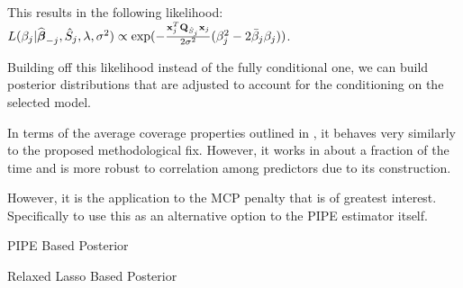 
This results in the following likelihood: $L(\beta_j|\widehat{\boldsymbol{\beta}}_{-j}, \hat{S}_j, \lambda, \sigma^2) \propto \exp(-\frac{\mathbf{x}_j^T \mathbf{Q}_{\hat{S}_j} \mathbf{x}_j}{2\sigma^2}(\beta_{j}^2 - 2 \bar{\beta}_{j} \beta_{j}))$. 

Building off this likelihood instead of the fully conditional one, we can build posterior distributions that are adjusted to account for the conditioning on the selected model.

In terms of the average coverage properties outlined in , it behaves very similarly to the proposed methodological fix. However, it works in about a fraction of the time and is more robust to correlation among predictors due to its construction. 

However, it is the application to the MCP penalty that is of greatest interest. Specifically to use this as an alternative option to the PIPE estimator itself.
\begin{table}[hbtp]
    \centering
    
    \caption{\label{Tab:dist_beta} PIPE Based Posterior}
  \end{table}

\begin{table}[hbtp]
\centering

\caption{\label{Tab:dist_beta_relaxed} Relaxed Lasso Based Posterior}
\end{table}